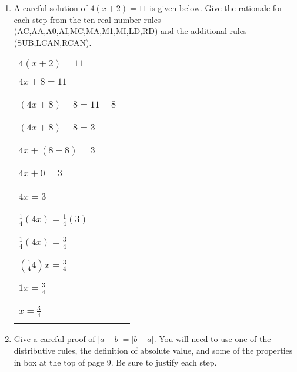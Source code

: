 \documentclass[letterpaper,12pt,fleqn]{article}
\begin{document}
\begin{enumerate}
\newpage

\item A careful solution of $4(x+2)=11$ is given below. Give the rationale for
each step from the ten real number rules (AC,AA,A0,AI,MC,MA,M1,MI,LD,RD) and
the additional rules (SUB,LCAN,RCAN).

\newcommand{\fillin}{\rule{1in}{1pt}}

\begin{tabular}{ll}
$4(x+2)=11$ & \\
$4x+8=11$ & \fillin \\
$(4x+8)-8=11-8$ & \fillin \\
$(4x+8)-8=3$ & \fillin \\
$4x+(8-8)=3$ & \fillin \\
$4x+0=3$ & \fillin \\
$4x=3$ & \fillin \\
$\frac{1}{4}(4x)=\frac{1}{4}(3)$ & \fillin \\
$\frac{1}{4}(4x)=\frac{3}{4}$ & \fillin \\
$(\frac{1}{4}4)x=\frac{3}{4}$ & \fillin \\
$1x=\frac{3}{4}$ & \fillin \\
$x=\frac{3}{4}$ & \fillin \\
\end{tabular}

\item Give a careful proof of $|a-b|=|b-a|$. You will need to use one of the
distributive rules, the definition of absolute value, and some of the
properties in box at the top of page 9. Be sure to justify each step.
\end{enumerate}
\end{document}
